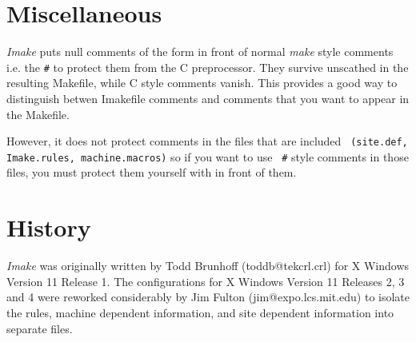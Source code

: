 \section{Miscellaneous}

{\em Imake} puts null comments of the form {\tt \/\*\*\/} in front of
normal {\em make} style comments i.e. the {\tt \#} to protect them
from the C preprocessor. They survive unscathed in the resulting
Makefile, while C style comments vanish. This provides a good way to
distinguish betwen Imakefile comments and comments that you want to
appear in the Makefile.

However, it does not protect comments in the files that are included {\tt
(site.def, Imake.rules, machine.macros)} so if you want to use {\tt
\#} style comments in those files, you must protect them yourself with
{\tt \/\*\*\/} in front of them.

\section{History}

{\em Imake} was originally written by Todd Brunhoff (toddb@tekcrl.crl)
for X Windows Version 11 Release 1. The configurations for X Windows
Version 11 Releases 2, 3 and 4 were reworked considerably by Jim Fulton
(jim@expo.lcs.mit.edu) to isolate the rules, machine dependent
information, and site dependent information into separate files.


